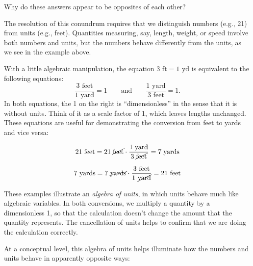 \documentclass[nooutcomes]{ximera}
\begin{document}
Why do these answers appear to be opposites of each other?  

The resolution of this conundrum requires that we distinguish numbers (e.g., 21) from units (e.g., feet).  Quantities measuring, say, length, weight, or speed involve both numbers and units, but the numbers behave differently from the units, as we see in the example above.  

With a little algebraic manipulation, the equation $3\textrm{ ft} = 1 \textrm{ yd}$ is equivalent to the following equations:  
\[
\frac{3\textrm{ feet}}{1 \textrm{ yard}} = 1\qquad \textrm{and}\qquad \frac{1 \textrm{ yard}}{3\textrm{ feet}} = 1.
\]
In both equations, the 1 on the right is ``dimensionless'' in the sense that it is without units.  Think of it as a scale factor of 1, which leaves lengths unchanged.  These equations are useful for demonstrating the conversion from feet to yards and vice versa:  

%


\[
21\;\textrm{feet} = 21\;\cancel{\textrm{feet}} \cdot \frac{{1\;\textrm{yard}}}{3\;\cancel{\textrm{feet}}} = 7\;\textrm{yards}
\]

\[
7\textrm{ yards} = 7\textrm{ \cancel{yards}} \cdot \frac{{3 \textrm{ feet}}}{1\textrm{ \cancel{yard}}} = 
21\textrm{ feet}
\]

These examples illustrate an \emph{algebra of units}, in which units behave much like algebraic variables.  In both conversions, we multiply a quantity by a dimensionless 1, so that the calculation doesn't change the amount that the quantity represents.  The cancellation of units helps to confirm that we are doing the calculation correctly.  

At a conceptual level, this algebra of units helps illuminate how the numbers and units behave in apparently opposite ways:  
\end{document}
